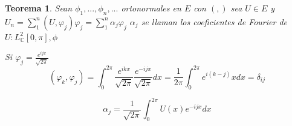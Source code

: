\documentclass[a4paper,10pt]{book}
\newtheorem{theorem}{Teorema}
\begin{document}
\begin{theorem}
Sean $\phi_1,...,\phi_n,...$ ortonormales en $E$ con $(,)$
sea $U\in E$ y $ U_n = \sum\limits_1^n (U,\varphi_j) \varphi_j = \sum\limits_1^n \alpha_j \varphi_j$
$\alpha_j$ se llaman los coeficientes de Fourier de $U: L^2_{\mathbb{C}} [0,\pi ] , \phi $

Si $\varphi_j = \frac{ e^{ijx} } {\sqrt{2\pi}}$
\[
(\varphi_k,\varphi_j)= \int_0^{2\pi} \frac{e^{ikx}}{\sqrt{ 2\pi}} \frac{e^{-ijx}}{\sqrt{ 2\pi}} dx= \frac{1}{2\pi} \int_0^{2\pi} e^{i(k-j)}x dx = \delta_{ij}
\]

\[
\alpha_j=\frac{1}{\sqrt{2 \pi}} \int_0^{2\pi} U(x) e^{-ijx} dx
\]

\end{theorem}
\end{document}
